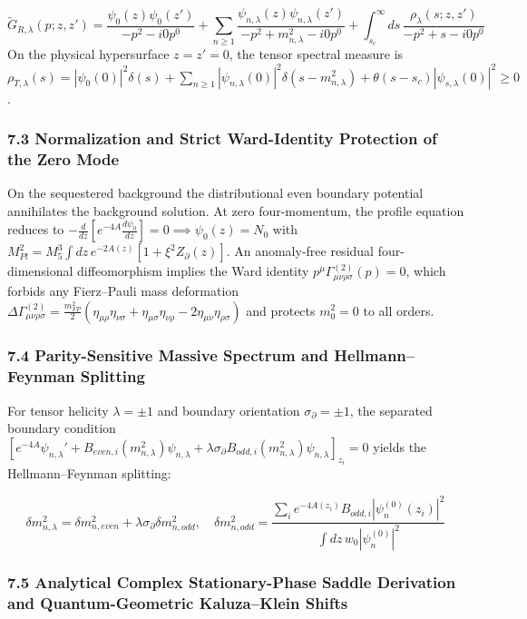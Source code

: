 \documentclass[aps,prd,onecolumn,superscriptaddress,nofootinbib,longbibliography,10pt]{revtex4-2}
\begin{document}
\[\tilde{G}_{R,\lambda}(p; z,z') = \frac{\psi_0(z)\psi_0(z')}{-p^2 - i0p^0} + \sum_{n\ge 1}\frac{\psi_{n,\lambda}(z)\psi_{n,\lambda}(z')}{-p^2 + m_{n,\lambda}^2 - i0p^0} + \int_{s_c}^\infty ds\,\frac{\rho_\lambda(s; z,z')}{-p^2 + s - i0p^0}\]
On the physical hypersurface \(z = z' = 0\), the tensor spectral measure is \(\rho_{T,\lambda}(s) = |\psi_0(0)|^2\delta(s) + \sum_{n\ge 1}|\psi_{n,\lambda}(0)|^2\delta(s - m_{n,\lambda}^2) + \theta(s - s_c)|\psi_{s,\lambda}(0)|^2 \ge 0\).




\subsubsection*{7.3 Normalization and Strict Ward-Identity Protection of the Zero Mode}

On the sequestered background the distributional even boundary potential annihilates the background solution. At zero four-momentum, the profile equation reduces to \(-\frac{d}{dz}[e^{-4A}\frac{d\psi_0}{dz}] = 0 \implies \psi_0(z) = N_0\) with \(M_{Pl}^2 = M_5^3 \int dz\,e^{-2A(z)}[1 + \xi^2 Z_\partial(z)]\). An anomaly-free residual four-dimensional diffeomorphism implies the Ward identity \(p^\mu \Gamma_{\mu\nu\rho\sigma}^{(2)}(p) = 0\), which forbids any Fierz--Pauli mass deformation \(\Delta\Gamma_{\mu\nu\rho\sigma}^{(2)} = \frac{m_{FP}^2}{2}(\eta_{\mu\rho}\eta_{\nu\sigma} + \eta_{\mu\sigma}\eta_{\nu\rho} - 2\eta_{\mu\nu}\eta_{\rho\sigma})\) and protects \(m_0^2 = 0\) to all orders.




\subsubsection*{7.4 Parity-Sensitive Massive Spectrum and Hellmann--Feynman Splitting}

For tensor helicity \(\lambda = \pm 1\) and boundary orientation \(\sigma_\partial = \pm 1\), the separated boundary condition \(\left[ e^{-4A}\psi_{n,\lambda}' + B_{even,i}(m_{n,\lambda}^2)\psi_{n,\lambda} + \lambda\sigma_\partial B_{odd,i}(m_{n,\lambda}^2)\psi_{n,\lambda} \right]_{z_i} = 0\) yields the Hellmann--Feynman splitting:


\[\delta m_{n,\lambda}^2 = \delta m_{n,even}^2 + \lambda\sigma_\partial \delta m_{n,odd}^2, \quad \delta m_{n,odd}^2 = \frac{\sum_i e^{-4A(z_i)} B_{odd,i} |\psi_n^{(0)}(z_i)|^2}{\int dz\,w_0 |\psi_n^{(0)}|^2}\]


\subsubsection*{7.5 Analytical Complex Stationary-Phase Saddle Derivation and Quantum-Geometric Kaluza--Klein Shifts}
\end{document}
